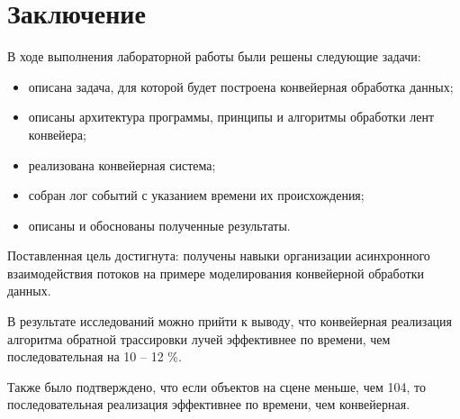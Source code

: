 \chapter*{\hfill{\centering Заключение}\hfill}

В ходе выполнения лабораторной работы были решены следующие задачи:

\begin{itemize}[label=---]
	\item описана задача, для которой будет построена конвейерная обработка данных;
	\item описаны архитектура программы, принципы и алгоритмы обработки лент конвейера;
	\item реализована конвейерная система;
	\item собран лог событий с указанием времени их происхождения; 
	\item описаны и обоснованы полученные результаты.
\end{itemize}

Поставленная цель достигнута: получены навыки организации асинхронного взаимодействия потоков на примере моделирования конвейерной обработки данных.

В результате исследований можно прийти к выводу, что конвейерная реализация алгоритма обратной трассировки лучей эффективнее по времени, чем последовательная на 10 -- 12 \%.

Также было подтверждено, что если объектов на сцене меньше, чем 104, то последовательная реализация эффективнее по времени, чем конвейерная.